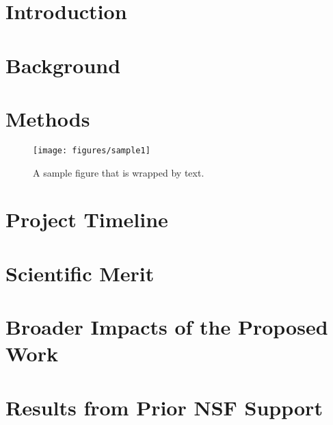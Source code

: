 

\section{Introduction}
\label{sec:intro}

\lipsum{}

\section{Background}
\label{sec:bg}

\lipsum{}

\section{Methods}
\label{sec:methods}

\lipsum{}

\setlength\intextsep{0pt}
\begin{wrapfigure}[20]{R}{2.4in}
 \vspace{-15pt}
 \centering
 \texttt{[image: figures/sample1]}
 \caption{A sample figure that is wrapped by text.}
 \label{fig:sample}
\end{wrapfigure}

\section{Project Timeline}
\label{sec:timeline}

\lipsum{}

\section{Scientific Merit}
\label{sec:merit}

\lipsum{}

\section{Broader Impacts of the Proposed Work}
\label{sec:broader}

\lipsum{}

\section{Results from Prior NSF Support}
\label{sec:prior}

\lipsum{}
